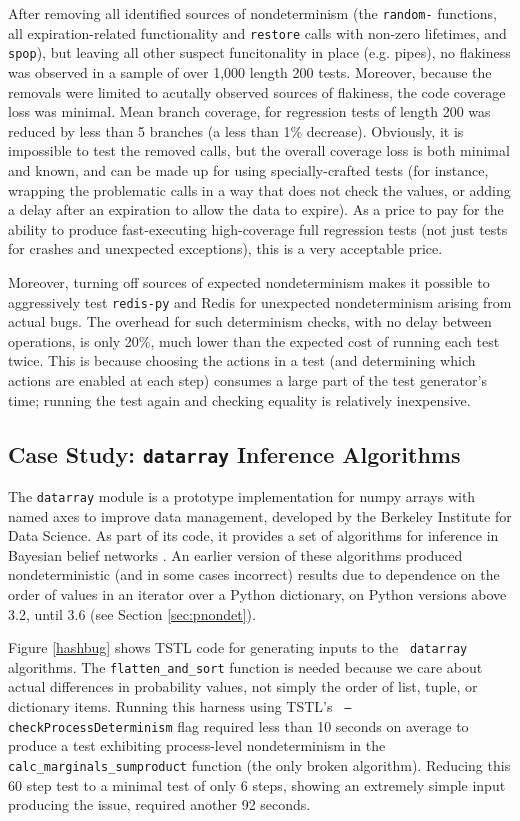 After removing all identified sources of nondeterminism (the {\tt random-} functions, all
expiration-related functionality and {\tt restore} calls with non-zero
lifetimes, and {\tt spop}), but leaving all other suspect funcitonality in
place (e.g. pipes), no flakiness was observed in a sample of over 1,000 length
200 tests.  Moreover, because the removals were limited to acutally
observed sources of flakiness, the code coverage loss was minimal.
Mean branch coverage, for regression tests of length 200 was reduced
by less than 5 branches (a less than 1\% decrease).  Obviously, it is
impossible to test the removed calls, but the overall coverage loss is
both minimal and known, and can be made up for using specially-crafted
tests (for instance, wrapping the problematic calls in a way that does
not check the values, or adding a delay after an expiration to allow
the data to expire).  As a price to pay for the ability to produce
fast-executing high-coverage full regression tests (not just tests for
crashes and unexpected exceptions), this is a very acceptable price.

Moreover, turning off sources of expected nondeterminism makes
it possible to aggressively test {\tt redis-py} and Redis for
unexpected nondeterminism arising from actual bugs.  The overhead for such
determinism checks, with no delay between operations, is only
20\%, much lower than the expected cost of running each test twice.
This is because choosing the actions in a test (and determining which
actions are enabled at each step) consumes a large part of the test
generator's time; running the test again and checking equality is
relatively inexpensive.  

\subsection{Case Study: {\tt datarray} Inference Algorithms}

The {\tt datarray} module \cite{datarray} is a prototype
implementation for numpy arrays with named axes to improve data
management, developed by the Berkeley Institute for Data Science.  As part of its code, it provides a set of algorithms for
inference in
Bayesian belief networks \cite{russell2016artificial}.  An earlier
version of these algorithms produced nondeterministic (and in some
cases incorrect) results due to dependence on the order of values in
an iterator over a Python dictionary, on Python versions above 3.2, until 3.6 (see Section \ref{sec:pnondet}).

Figure \ref{hashbug} shows TSTL code for generating inputs to the {\tt
  datarray} algorithms.  The {\tt flatten\_and\_sort} function is needed because we care about actual differences in probability values, not simply the order of list, tuple, or dictionary items.  Running this harness using TSTL's {\tt
  --checkProcessDeterminism} flag required less than 10 seconds on
average to produce a test exhibiting process-level nondeterminism in
the {\tt calc\_marginals\_sumproduct} function (the only broken
algorithm).  Reducing this 60 step test to a minimal test of only 6 steps,
showing an extremely simple input producing the issue, 
required another 92 seconds.

